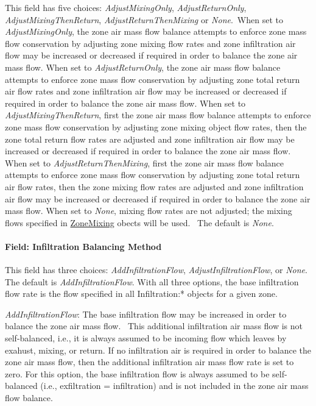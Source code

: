 This field has five choices: \emph{AdjustMixingOnly}, \emph{AdjustReturnOnly}, \emph{AdjustMixingThenReturn}, \emph{AdjustReturnThenMixing} or \emph{None}.~When set to \emph{AdjustMixingOnly}, the zone air mass flow balance attempts to enforce zone mass flow conservation by adjusting zone mixing flow rates and zone infiltration air flow may be increased or decreased if required in order to balance the zone air mass flow. When set to \emph{AdjustReturnOnly}, the zone air mass flow balance attempts to enforce zone mass flow conservation by adjusting zone total return air flow rates and zone infiltration air flow may be increased or decreased if required in order to balance the zone air mass flow. When set to \emph{AdjustMixingThenReturn}, first the zone air mass flow balance attempts to enforce zone mass flow conservation by adjusting zone mixing object flow rates, then the zone total return flow rates are adjusted and zone infiltration air flow may be increased or decreased if required in order to balance the zone air mass flow. When set to \emph{AdjustReturnThenMixing}, first the zone air mass flow balance attempts to enforce zone mass flow conservation by adjusting zone total return air flow rates, then the zone mixing flow rates are adjusted and zone infiltration air flow may be increased or decreased if required in order to balance the zone air mass flow. When set to \emph{None}, mixing flow rates are not adjusted; the mixing flows specified in \hyperref[zonemixing]{ZoneMixing} obects will be used.~ The default is \emph{None}.

\paragraph{Field: Infiltration Balancing Method}\label{field-infiltration-balancing-method}

This field has three choices: \emph{AddInfiltrationFlow}, \emph{AdjustInfiltrationFlow}, or \emph{None}. The default is \emph{AddInfiltrationFlow}. With all three options, the base infiltration flow rate is the flow specified in all Infiltration:* objects for a given zone.

\emph{AddInfiltrationFlow}: The base infiltration flow may be increased in order to balance the zone air mass flow.~ This additional infiltration air mass flow is not self-balanced, i.e., it is always assumed to be incoming flow which leaves by exahust, mixing, or return. If no infiltration air is required in order to balance the zone air mass flow, then the additional infiltration air mass flow rate is set to zero. For this option, the base infiltration flow is always assumed to be self-balanced (i.e., exfiltration = infiltration) and is not included in the zone air mass flow balance.

